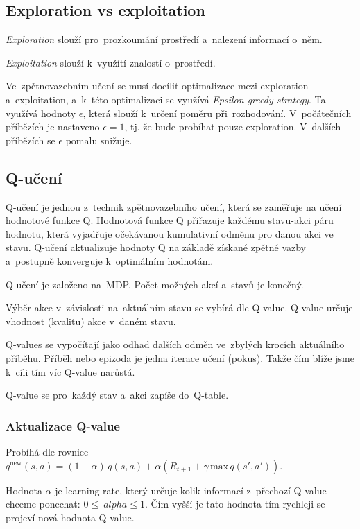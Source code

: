 \subsection{Exploration vs exploitation}

\emph{Exploration} slouží pro~prozkoumání prostředí a~nalezení informací o~něm.

\emph{Exploitation} slouží k~využítí znalostí o~prostředí.

Ve~zpětnovazebním učení se musí docílit optimalizace mezi exploration a~exploitation, a~k~této optimalizaci se využívá \emph{Epsilon greedy strategy}.
Ta využívá hodnoty $\epsilon$, která slouží k~určení poměru při~rozhodování.
V~počátečních příbězích je nastaveno $\epsilon = 1$, tj. že bude probíhat pouze exploration.
V~dalších příbězích se $\epsilon$ pomalu snižuje.

\subsection{Q-učení}

Q-učení je jednou z~technik zpětnovazebního učení, která se zaměřuje na učení hodnotové funkce Q. Hodnotová funkce Q přiřazuje každému stavu-akci páru hodnotu, která vyjadřuje očekávanou kumulativní odměnu pro danou akci ve stavu. Q-učení aktualizuje hodnoty Q na základě získané zpětné vazby a~postupně konverguje k~optimálním hodnotám.

Q-učení je založeno na~MDP.
Počet možných akcí a~stavů je konečný.

Výběr akce v~závislosti na~aktuálním stavu se vybírá dle Q-value.
Q-value určuje vhodnost (kvalitu) akce v~daném stavu.

Q-values se vypočítají jako odhad dalších odměn ve~zbylých krocích aktuálního příběhu.
Příběh nebo epizoda je jedna iterace učení (pokus).
Takže čím blíže jsme k~cíli tím víc Q-value narůstá.

Q-value se pro~každý stav a~akci zapíše do~Q-table.

\subsubsection{Aktualizace Q-value}

Probíhá dle rovnice
$q^\text{new}(s,a) = (1-\alpha)\, q(s,a) + \alpha \left(R_{t+1} + \gamma\,\text{max}\,q(s',a')\right)$.

Hodnota $\alpha$ je learning rate, který určuje kolik informací z~přechozí Q-value chceme ponechat: $0 \leq\ alpha \leq 1$.
Čím vyšší je tato hodnota tím rychleji se projeví nová hodnota Q-value.

